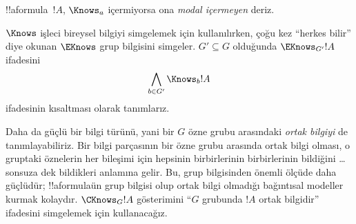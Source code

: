 !!a{formula}~$!A$, $\Knows_a$ içermiyorsa ona \emph{modal içermeyen} deriz.

\begin{defn}
  $\Knows$ işleci bireysel bilgiyi simgelemek için kullanılırken, çoğu kez
  ``herkes bilir'' diye okunan $\EKnows$ grup bilgisini simgeler. $G' \subseteq
  G$ olduğunda $\EKnows_{G'} !A$ ifadesini
  \[\bigwedge_{b \in G'} \Knows_b !A\]
  ifadesinin kısaltması olarak tanımlarız.
\end{defn}

Daha da güçlü bir bilgi türünü, yani bir $G$ özne grubu arasındaki
\emph{ortak bilgiyi} de tanımlayabiliriz. Bir bilgi parçasının bir özne grubu
arasında ortak bilgi olması, o gruptaki öznelerin her bileşimi için hepsinin
birbirlerinin birbirlerinin bildiğini \dots sonsuza dek bildikleri anlamına
gelir. Bu, grup bilgisinden önemli ölçüde daha güçlüdür; !!a{formula}{}ün grup
bilgisi olup ortak bilgi olmadığı bağıntısal modeller kurmak kolaydır.
$\CKnows_G !A$ gösterimini ``$G$ grubunda $!A$ ortak bilgidir'' ifadesini
simgelemek için kullanacağız.


